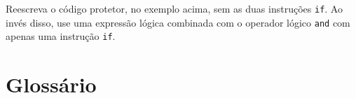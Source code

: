 \begin{enumerate}
\begin{ex}
Reescreva o código protetor, no exemplo acima, sem as duas instruções {\tt if}. Ao invés
disso, use uma expressão lógica combinada com o operador lógico {\tt and} com apenas uma
instrução {\tt if}.
\end{ex}

\end{enumerate}

\section{Glossário}

